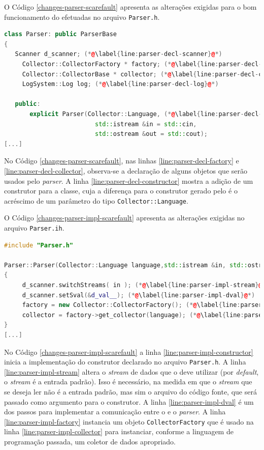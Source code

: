 O Código \ref{changes-parser-scarefault} apresenta as alterações exigidas para
o bom funcionamento do \scarefault efetuadas no arquivo \lstinline|Parser.h|.

\begin{lstlisting}[language=C++, label=changes-parser-scarefault, caption=Alterações no \lstinline|Parser.h| para uso do \scarefault]
class Parser: public ParserBase
{
   Scanner d_scanner; (*@\label{line:parser-decl-scanner}@*)
	 Collector::CollectorFactory * factory; (*@\label{line:parser-decl-factory}@*)
	 Collector::CollectorBase * collector; (*@\label{line:parser-decl-collector}@*)
	 LogSystem::Log log; (*@\label{line:parser-decl-log}@*)
        
   public:
	   explicit Parser(Collector::Language, (*@\label{line:parser-decl-constructor}@*)
		                 std::istream &in = std::cin,
		                 std::ostream &out = std::cout);
[...]
\end{lstlisting}

No Código \ref{changes-parser-scarefault}, nas linhas
\ref{line:parser-decl-factory} e \ref{line:parser-decl-collector}, observa-se
a declaração de alguns objetos que serão usados pelo \textit{parser}. A linha
\ref{line:parser-decl-constructor} mostra a adição de um construtor para a
classe, cuja a diferença para o construtor gerado pelo \bisoncpp é o acréscimo
de um parâmetro do tipo \lstinline|Collector::Language|.

O Código \ref{changes-parser-impl-scarefault} apresenta as alterações exigidas
no arquivo \lstinline|Parser.ih|.

\begin{lstlisting}[language=C++, label=changes-parser-impl-scarefault, caption=Alterações no \lstinline|Parser.ih| para uso do \scarefault]
#include "Parser.h"

Parser::Parser(Collector::Language language,std::istream &in, std::ostream &out) (*@\label{line:parser-impl-constructor}@*)
{
	 d_scanner.switchStreams( in ); (*@\label{line:parser-impl-stream}@*)
	 d_scanner.setSval(&d_val__); (*@\label{line:parser-impl-dval}@*)
	 factory = new Collector::CollectorFactory(); (*@\label{line:parser-impl-factory}@*)
	 collector = factory->get_collector(language); (*@\label{line:parser-impl-collector}@*)
}
[...]
\end{lstlisting}

No Código \ref{changes-parser-impl-scarefault} a linha \ref{line:parser-impl-constructor}
inicia a implementação do construtor declarado no arquivo \lstinline|Parser.h|.
A linha \ref{line:parser-impl-stream} altera o \textit{stream} de dados que
o \parser deve utilizar (por \textit{default}, o \textit{stream} é a entrada
padrão). Isso é necessário, na medida em que o \textit{stream} que se deseja
ler não é a entrada padrão, mas sim o arquivo do código fonte, que será
passado como argumento para o construtor. A linha
\ref{line:parser-impl-dval} é um dos passos para implementar a comunicação
entre o \scanner e o \textit{parser}. A linha \ref{line:parser-impl-factory}
instancia um objeto \lstinline|CollectorFactory| que é usado na linha
\ref{line:parser-impl-collector} para instanciar, conforme a linguagem de
programação passada, um coletor de dados apropriado.


